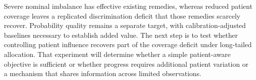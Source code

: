 \documentclass[11pt]{article}
\begin{document}
Severe nominal imbalance has effective existing remedies, whereas reduced patient coverage leaves a replicated discrimination deficit that those remedies scarcely recover. Probability quality remains a separate target, with calibration-adjusted baselines necessary to establish added value. The next step is to test whether controlling patient influence recovers part of the coverage deficit under long-tailed allocation. That experiment will determine whether a simple patient-aware objective is sufficient or whether progress requires additional patient variation or a mechanism that shares information across limited observations.
\newpage
\appendix
{}
{}



\clearpage


\end{document}
